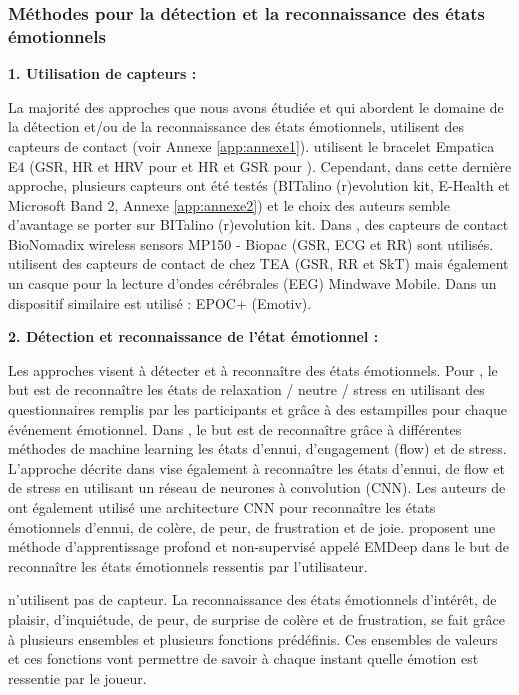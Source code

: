 \documentclass[11pt]{article}
\begin{document}
		\subsubsection{Méthodes pour la détection et la reconnaissance des états émotionnels}\label{sec:etatemotionnel}
			\textbf{1. Utilisation de capteurs :}\par
            La majorité des approches que nous avons étudiée et qui abordent le domaine de la détection et/ou de la reconnaissance des états émotionnels, utilisent des capteurs de contact (voir Annexe \ref{app:annexe1}). 
            \cite{maier_et_al._2019,nalepa_et_al._2017,gizycka_et_al._2018} utilisent le bracelet Empatica E4 (GSR, HR et HRV pour \cite{maier_et_al._2019} et HR et GSR pour \cite{nalepa_et_al._2017,gizycka_et_al._2018}). 
            Cependant, dans cette dernière approche, plusieurs capteurs ont été testés (BITalino (r)evolution kit, E-Health et Microsoft Band 2, Annexe \ref{app:annexe2}) et le choix des auteurs semble d'avantage se porter sur BITalino (r)evolution kit. 
            Dans \cite{yang_et_al._2018}, des capteurs de contact BioNomadix wireless sensors MP150 - Biopac (GSR, ECG et RR) sont utilisés. 
            \cite{gal_2019,gal_et_al._2020} utilisent des capteurs de contact de chez TEA (GSR, RR et SkT) mais également un casque pour la lecture d'ondes cérébrales (EEG) Mindwave Mobile. 
            Dans \cite{carofiglio_et_al._2019} un dispositif similaire est utilisé : EPOC+ (Emotiv).\par 
            \vspace*{0.6cm}
        	\textbf{2. Détection et reconnaissance de l'état émotionnel :}\par
            Les approches visent à détecter et à reconnaître des états émotionnels. Pour \cite{nalepa_et_al._2017,gizycka_et_al._2018}, le but est de reconnaître les états de relaxation / neutre / stress en utilisant des questionnaires remplis par les participants et grâce à des estampilles pour chaque événement émotionnel. 
            Dans \cite{carofiglio_et_al._2019}, le but est de reconnaître grâce à différentes méthodes de machine learning les états d'ennui, d'engagement (flow) et de stress. 
            L'approche décrite dans \cite{maier_et_al._2019} vise également à reconnaître les états d'ennui, de flow et de stress en utilisant un réseau de neurones à convolution (CNN). 
            Les auteurs de \cite{yang_et_al._2018} ont également utilisé une architecture CNN pour reconnaître les états émotionnels d'ennui, de colère, de peur, de frustration et de joie. 
            \cite{gal_2019,gal_et_al._2020} proposent une méthode d'apprentissage profond et non-supervisé appelé EMDeep dans le but de reconnaître les états émotionnels ressentis par l'utilisateur.\par
            \cite{Mostefai_et_al._2019} n'utilisent pas de capteur. La reconnaissance des états émotionnels d'intérêt, de plaisir, d'inquiétude, de peur, de surprise de colère et de frustration, se fait grâce à plusieurs ensembles et plusieurs fonctions prédéfinis. Ces ensembles de valeurs et ces fonctions vont permettre de savoir à chaque instant quelle émotion est ressentie par le joueur.
\end{document}

